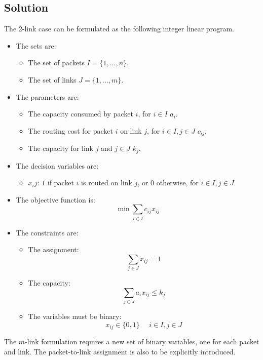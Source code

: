 \documentclass[12pt, a4paper]{report}
\begin{document}
    \subsection*{Solution}
        The 2-link case can be formulated as the following integer linear program. 
        \begin{itemize}
            \item The sets are: 
                \begin{itemize}
                    \item The set of packets $I=\{1,\dots,n\}$. 
                    \item The set of links $J=\{1,\dots,m\}$. 
                \end{itemize}
            \item The parameters are: 
                \begin{itemize}
                    \item The capacity consumed by packet $i$, for $i \in I$ $a_i$.
                    \item The routing cost for packet $i$ on link $j$, for $i \in I,j \in J$ $c_{ij}$.
                    \item The capacity for link $j$ and $j \in J$ $k_{j}$. 
                \end{itemize}
            \item The decision variables are:
                \begin{itemize}
                    \item $x_ij$: $1$ if packet $i$ is routed on link $j$, or 0 otherwise, for $i \in I,j \in J$
                \end{itemize}
            \item The objective function is: 
                \[\min{\sum_{i \in I}{c_{ij}x_{ij}}}\]
            \item The constraints are:
                \begin{itemize}
                    \item The assignment: 
                        \[\sum_{j \in J}x_{ij} = 1\]
                    \item The capacity: 
                        \[\sum_{j \in J}a_ix_{ij} \leq k_j\]
                    \item The variables must be binary: 
                        \[x_{ij} \in \{0,1\} \:\:\:\:\:\: i \in I,j \in J\]
                \end{itemize}
        \end{itemize}
        The $m$-link formulation requires a new set of binary variables, one for each packet and link. The packet-to-link assignment is also to be explicitly introduced. 
\end{document}
